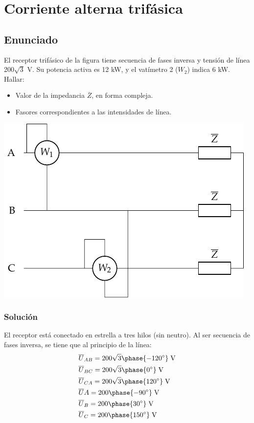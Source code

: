 \chapter{Corriente alterna trifásica}
\section{Enunciado}
 
El receptor trifásico de la figura tiene secuencia de fases inversa y tensión de línea 200$\sqrt{3}$ V. Su potencia activa es 12 kW, y el vatímetro 2 ($W_2$) indica 6 kW. Hallar:
\begin{itemize}
    \item Valor de la impedancia $\overline{Z}$, en forma compleja.
    \item Fasores correspondientes a las intensidades de línea.
\end{itemize}

\begin{center}
  \includegraphics[width=0.5\linewidth]{figuras/ej6_BT3.pdf}
\end{center}

\subsection*{Solución}

El receptor está conectado en estrella a tres hilos (sin neutro). Al ser secuencia de fases inversa, se tiene que al principio de la línea:
\begin{align*}
    &\overline{U}_{AB}=200\sqrt{3}\phase{-120^\circ}\;\text{V} \\
    &\overline{U}_{BC}=200\sqrt{3}\phase{0^\circ}\;\text{V} \\
    &\overline{U}_{CA}=200\sqrt{3}\phase{120^\circ}\;\text{V}  \\
    &\overline{U}A=200\phase{-90^\circ}\;\text{V}\\
    &\overline{U}_B=200\phase{30^\circ}\;\text{V}\\
    &\overline{U}_C=200\phase{150^\circ}\;\text{V}
\end{align*}

